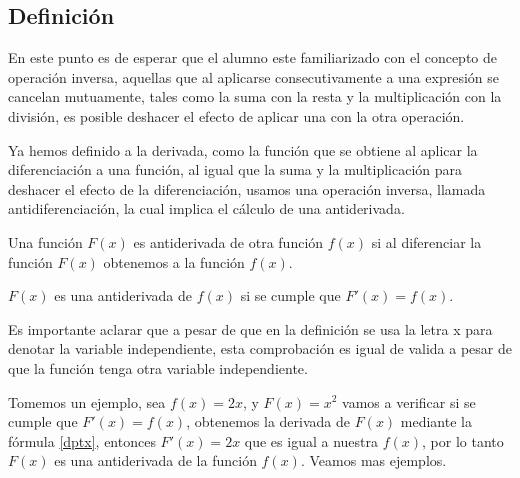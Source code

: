 \documentclass[11pt,letterpaper,oneside]{book}
\numberwithin{equation}{section}
\begin{document}
	\subsection{Definición}
	\par  %
	En este punto es de esperar que el alumno este familiarizado con el concepto de operación inversa, aquellas que al aplicarse consecutivamente a una expresión  se cancelan mutuamente, tales como la suma con la resta y la multiplicación con la división, es posible deshacer el efecto de aplicar una con la otra operación. \vspace{0.6 mm}
	\par %
	Ya hemos definido a la derivada, como la función que se obtiene al aplicar la diferenciación a una función, al igual que la suma y la multiplicación para deshacer el efecto de la diferenciación, usamos una operación inversa, llamada antidiferenciación, la cual implica el cálculo de una antiderivada. \vspace{0.6mm}
	\par 
	Una función $F(x)$ es antiderivada de otra función $f(x)$ si al diferenciar la función $F(x)$ obtenemos a la función $f(x)$.
	\begin{definición}
		$F(x)$ es una antiderivada de $f(x)$ si se cumple que $F'(x)=f(x)$.
	\end{definición}
	
	\par
	Es importante aclarar que a pesar de que en la definición se usa la letra x para denotar la variable independiente, esta comprobación es igual de valida a pesar de que la función tenga otra variable independiente. 
	
	\par	
	Tomemos un ejemplo, sea $f(x)=2x$, y $F(x)=x^2$ vamos a verificar si se cumple que $F'(x)=f(x)$, obtenemos la derivada de $F(x)$ mediante la fórmula \eqref{dptx}, entonces $F'(x)=2x$ que es igual a nuestra $f(x)$, por lo tanto $F(x)$ es una antiderivada de la función $f(x)$. Veamos mas ejemplos.
	
\end{document}
